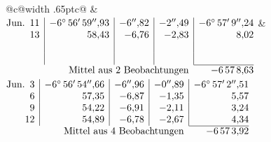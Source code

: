 \noindent\begin{tabular}{@{}c@{\hspace{.4em}\vrule width .65pt\hspace{.4em}}c@{}}
 &
 \\[.18ex]
\(\begin{array}[t]{@{}r|r|r|r|r@{}}
\text{Jun.}\enspace 11 & -6^\circ\,56'\,59''{,}93 & -6''{,}82 & -2''{,}49 & -6^\circ\,57'\,9''{,}24\\
13 & 58{,}43 & -6{,}76 & -2{,}83 & 8{,}02\\
 & & & & \\
 & & & & \\
\cline{5-5}
\multicolumn{4}{r}{\text{Mittel aus 2 Beobachtungen}} & -6\,57\,8{,}63
\end{array}\)
&
\(\begin{array}[t]{@{}r|r|r|r|r@{}}
\text{Jun.}\enspace 3 & -6^\circ\,56'\,54''{,}66 & -6''{,}96 & -0''{,}89 & -6^\circ\,57'\,2''{,}51\\
6 & 57{,}35 & -6{,}87 & -1{,}35 & 5{,}57\\
9 & 54{,}22 & -6{,}91 & -2{,}11 & 3{,}24\\
12 & 54{,}89 & -6{,}78 & -2{,}67 & 4{,}34\\
\cline{5-5}
\multicolumn{4}{r}{\text{Mittel aus 4 Beobachtungen}} & -6\,57\,3{,}92
\end{array}\)
\end{tabular}\par\medskip
{}
